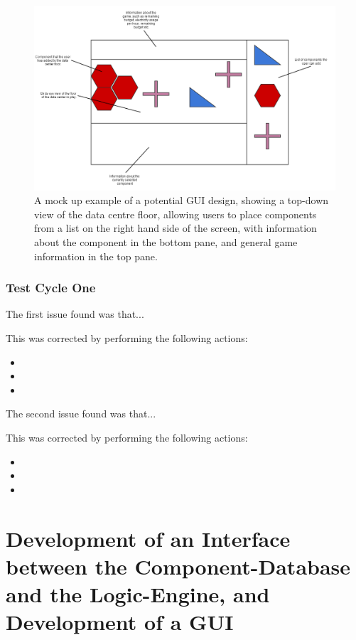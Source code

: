 \begin{figure}[H]
\centering
\includegraphics[width=7.25in]{Resources//GUI Mock up.png}
\caption{A mock up example of a potential GUI design, showing a top-down view of the \gls{data centre} floor, allowing users to place components from a list on the right hand side of the screen, with information about the component in the bottom pane, and general game information in the top pane.}
\label{fig:GUIMockUp}
\end{figure}

\subsubsection{Test Cycle One}
\label{sec:DevelopmentOfTheComponentDatabaseAndTheLogicEngineApplicationComponents:TestingOfTheComponentDatabaseAndTheLogicEngineViaTheTestInterface:TestCycleOne}

The first issue found was that...

This was corrected by performing the following actions:
\begin{itemize}
\item
\item
\item
\end{itemize}

The second issue found was that...

This was corrected by performing the following actions:
\begin{itemize}
\item
\item
\item
\end{itemize}

\section{Development of an Interface between the Component-Database and the Logic-Engine, and Development of a GUI}
\label{sec:DevelopmentOfAnInterfaceBetweenTheComponentDatabaseAndTheLogicEngineAndDevelopmentOfAGUI}

